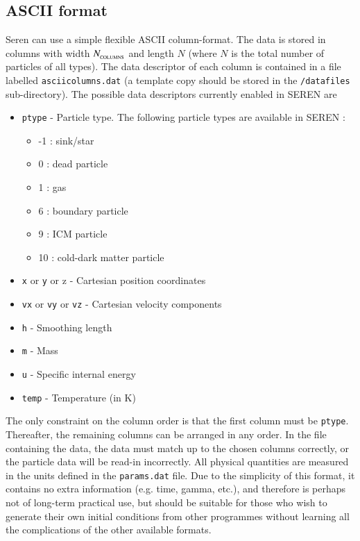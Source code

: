 \documentclass[a4paper]{article}
\newcommand{\NAME}{SEREN }
\newcommand{\var}[1]{\texttt{#1}}
\begin{document}
\subsection{ASCII format}
Seren can use a simple flexible ASCII column-format.  The data is stored in columns with width $N_{_{\rm COLUMNS}}$ and length $N$ (where $N$ is the total number of particles of all types).  The data descriptor of each column is contained in a file labelled \var{asciicolumns.dat} (a template copy should be stored in the \var{/datafiles} sub-directory).  The possible data descriptors currently enabled in \NAME are
\begin{itemize} 
\item \var{ptype} - Particle type.  The following particle types are available in \NAME : 
\begin{itemize}
\item -1 : sink/star
\item  0 : dead particle
\item  1 : gas
\item  6 : boundary particle
\item  9 : ICM particle
\item 10 : cold-dark matter particle
\end{itemize}
\item \var{x} or \var{y} or {z} - Cartesian position coordinates
\item \var{vx} or \var{vy} or \var{vz} - Cartesian velocity components
\item \var{h} - Smoothing length
\item \var{m} - Mass
\item \var{u} - Specific internal energy
\item \var{temp} - Temperature (in K)
\end{itemize}
The only constraint on the column order is that the first column must be \var{ptype}.  Thereafter, the remaining columns can be arranged in any order.  In the file containing the data, the data must match up to the chosen columns correctly, or the particle data will be read-in incorrectly.  All physical quantities are measured in the units defined in the \var{params.dat} file.  Due to the simplicity of this format, it contains no extra information (e.g. time, gamma, etc.), and therefore is perhaps not of long-term practical use, but should be suitable for those who wish to generate their own initial conditions from other programmes without learning all the complications of the other available formats.
\end{document}
